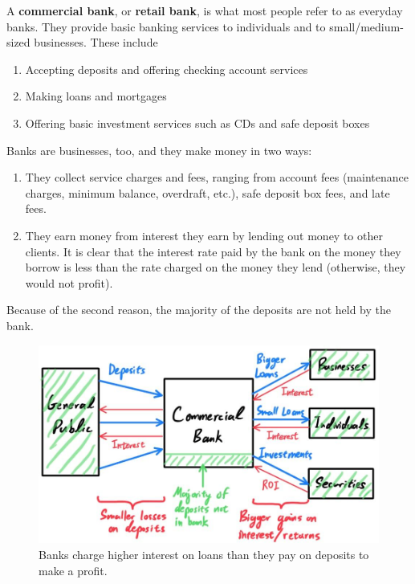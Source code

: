 \documentclass{article}
\begin{document}
    \begin{definition}
      A \textbf{commercial bank}, or \textbf{retail bank}, is what most people refer to as everyday banks. They provide basic banking services to individuals and to small/medium-sized businesses. These include
      \begin{enumerate}
        \item Accepting deposits and offering checking account services
        \item Making loans and mortgages
        \item Offering basic investment services such as CDs and safe deposit boxes
      \end{enumerate}
      Banks are businesses, too, and they make money in two ways:
      \begin{enumerate}
        \item They collect service charges and fees, ranging from account fees (maintenance charges, minimum balance, overdraft, etc.), safe deposit box fees, and late fees. 
        \item They earn money from interest they earn by lending out money to other clients. It is clear that the interest rate paid by the bank on the money they borrow is less than the rate charged on the money they lend (otherwise, they would not profit). 
      \end{enumerate}

      Because of the second reason, the majority of the deposits are not held by the bank. 

      \begin{figure}[H]
        \centering 
        \includegraphics[scale=0.3]{img/Banks_Profit_on_Interest.jpg}
        \caption{Banks charge higher interest on loans than they pay on deposits to make a profit.}  
        \label{fig:Banks_Profit_on_Interest}
      \end{figure}
    \end{definition}
\end{document}

